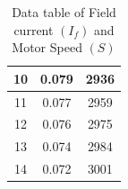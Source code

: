 \documentclass[a4paper,12pt]{article}
\begin{document}
\begin{table}[H]
\begin{subtable}[t]{1\textwidth}
\begin{tabular}{|c|c|c|}
		10          & 0.079                                                                      & 2936                                                                 \\ \hline
		11          & 0.077                                                                      & 2959                                                                 \\ \hline
		12          & 0.076                                                                      & 2975                                                                 \\ \hline
		13          & 0.074                                                                      & 2984                                                                 \\ \hline
		14          & 0.072                                                                      & 3001                                                                 \\ \hline
	\end{tabular}
\caption{Data table of Field current $(I_f)$ and Motor Speed $(S)$}
\vspace{1cm}
\end{subtable}


\end{table}
\end{document}
